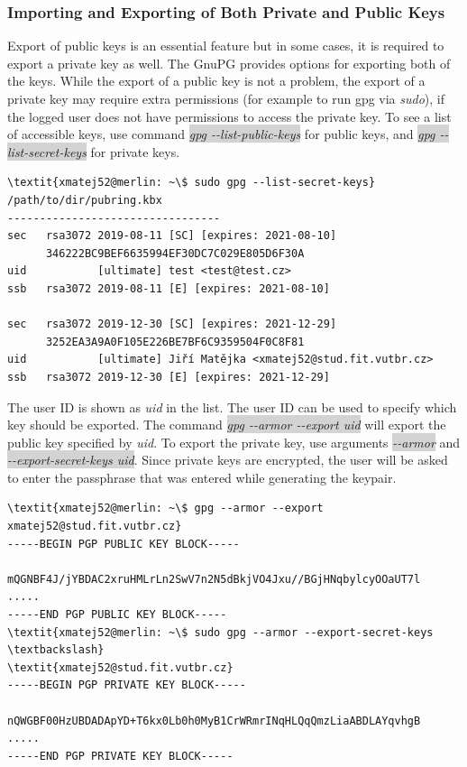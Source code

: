 \subsubsection*{Importing and Exporting of Both Private and Public Keys}
\label{text:keysExport}
Export of public keys is an essential feature but in some cases, it is required to export a private key as well. The GnuPG provides options for exporting both of the keys. While the export of a public key is not a problem, the export of a private key may require extra permissions (for example to run gpg via \textit{sudo}), if the logged user does not have permissions to access the private key. To see a list of accessible keys, use command \colorbox{lightgray}{\textit{gpg -{}-list-public-keys}} for public keys, and \colorbox{lightgray}{\textit{gpg -{}-list-secret-keys}} for private keys.
\begin{Verbatim}[commandchars=\\\{\},codes={\catcode`$=3\catcode`_=8},samepage=false,frame=single]
\textit{xmatej52@merlin: ~\$ sudo gpg --list-secret-keys}
/path/to/dir/pubring.kbx
---------------------------------
sec   rsa3072 2019-08-11 [SC] [expires: 2021-08-10]
      346222BC9BEF6635994EF30DC7C029E805D6F30A
uid           [ultimate] test <test@test.cz>
ssb   rsa3072 2019-08-11 [E] [expires: 2021-08-10]

sec   rsa3072 2019-12-30 [SC] [expires: 2021-12-29]
      3252EA3A9A0F105E226BE7BF6C9359504F0C8F81
uid           [ultimate] Jiří Matějka <xmatej52@stud.fit.vutbr.cz>
ssb   rsa3072 2019-12-30 [E] [expires: 2021-12-29]
\end{Verbatim}

The user ID is shown as \textit{uid} in the list. The user ID can be used to specify which key should be exported. The command \colorbox{lightgray}{\textit{gpg -{}-armor -{}-export uid}} will export the public key specified by \textit{uid}. To export the private key, use arguments \colorbox{lightgray}{\textit{-{}-armor}} and \\  \colorbox{lightgray}{\textit{-{}-export-secret-keys uid}}. Since private keys are encrypted, the user will be asked to enter the passphrase that was entered while generating the keypair.
\begin{Verbatim}[commandchars=\\\{\},codes={\catcode`$=3\catcode`_=8},samepage=false,frame=single]
\textit{xmatej52@merlin: ~\$ gpg --armor --export xmatej52@stud.fit.vutbr.cz}
-----BEGIN PGP PUBLIC KEY BLOCK-----

mQGNBF4J/jYBDAC2xruHMLrLn2SwV7n2N5dBkjVO4Jxu//BGjHNqbylcyOOaUT7l
.....
-----END PGP PUBLIC KEY BLOCK-----
\textit{xmatej52@merlin: ~\$ sudo gpg --armor --export-secret-keys \textbackslash}
\textit{xmatej52@stud.fit.vutbr.cz}
-----BEGIN PGP PRIVATE KEY BLOCK-----

nQWGBF00HzUBDADApYD+T6kx0Lb0h0MyB1CrWRmrINqHLQqQmzLiaABDLAYqvhgB
.....
-----END PGP PRIVATE KEY BLOCK-----
\end{Verbatim}

